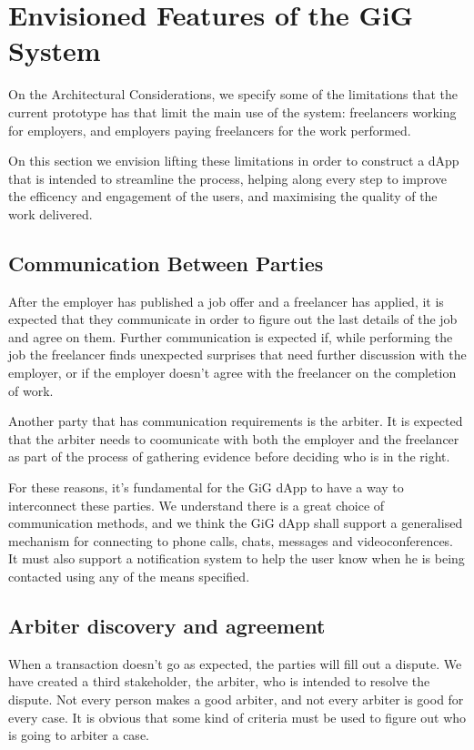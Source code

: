 \documentclass{article}
\begin{document}
\section{Envisioned Features of the GiG System}
On the Architectural Considerations, we specify some of the limitations that the current prototype has that limit the main use of the system: freelancers working for employers, and employers paying freelancers for the work performed.

On this section we envision lifting these limitations in order to construct a dApp that is intended to streamline the process, helping along every step to improve the efficency and engagement of the users, and maximising the quality of the work delivered.

\subsection{Communication Between Parties}

After the employer has published a job offer and a freelancer has applied, it is expected that they communicate in order to figure out the last details of the job and agree on them. Further communication is expected if, while performing the job the freelancer finds unexpected surprises that need further discussion with the employer, or if the employer doesn't agree with the freelancer on the completion of work.

Another party that has communication requirements is the arbiter. It is expected that the arbiter needs to coomunicate with both the employer and the freelancer as part of the process of gathering evidence before deciding who is in the right.

For these reasons, it's fundamental for the GiG dApp to have a way to interconnect these parties. We understand there is a great choice of communication methods, and we think the GiG dApp shall support a generalised mechanism for connecting to phone calls, chats, messages and videoconferences. It must also support a notification system to help the user know when he is being contacted using any of the means specified.

\subsection{Arbiter discovery and agreement}

When a transaction doesn't go as expected, the parties will fill out a dispute. We have created a third stakeholder, the arbiter, who is intended to resolve the dispute. Not every person makes a good arbiter, and not every arbiter is good for every case. It is obvious that some kind of criteria must be used to figure out who is going to arbiter a case.
\end{document}
